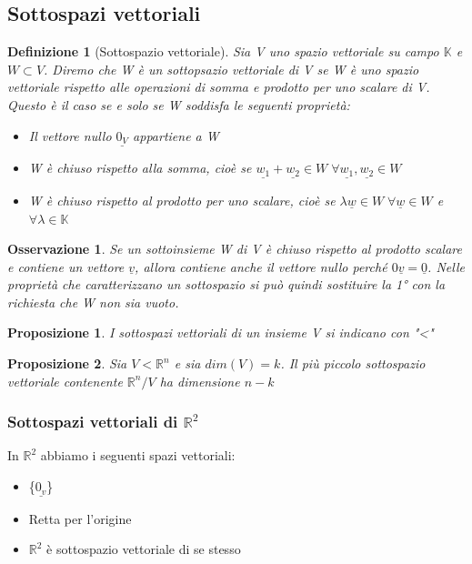 \documentclass[12pt]{article}
\newenvironment{para}{\begin{adjustwidth}{13mm}{}}{\end{adjustwidth}}
\newtheorem{Definizione}{Definizione}[subsection]
\newtheorem{Proposizione}{Proposizione}[subsection]
\newtheorem{Osservazione}{Osservazione}[subsection]
\begin{document}
\begin{para}
\subsection{Sottospazi vettoriali}
\begin{Definizione}[Sottospazio vettoriale]
Sia V uno spazio vettoriale su campo $\mathbb{K}$ e $W \subset V$. Diremo che W è un sottopsazio vettoriale di V se W è uno spazio vettoriale rispetto alle operazioni di somma e prodotto per uno scalare di V. Questo è il caso se e solo se W soddisfa le seguenti proprietà:
\begin{itemize}
    \item  Il vettore nullo $\underline{0_V}$ appartiene a W
    \item W è chiuso rispetto alla somma, cioè se $\underline{w_1}+\underline{w_2}\in W \; \forall\underline{w_1},\underline{w_2}\in W$
    \item W è chiuso rispetto al prodotto per uno scalare, cioè se $\lambda \underline{w}\in W \; \forall\underline{w}\in W$ e $\forall \lambda \in \mathbb{K}$
\end{itemize}
\end{Definizione}

\begin{Osservazione}
Se un sottoinsieme W di V è chiuso rispetto al prodotto scalare e contiene un vettore $\underline{v}$, allora contiene anche il vettore nullo perché $0\underline{v}=\underline{0}$. Nelle proprietà che caratterizzano un sottospazio si può quindi sostituire la 1° con la richiesta che W non sia vuoto.
\end{Osservazione}

\begin{Proposizione}
I sottospazi vettoriali di un insieme V si indicano con "<"
\end{Proposizione}
\begin{Proposizione}
    Sia $V < \mathbb{R}^n$ e sia $dim(V) = k$. Il più piccolo sottospazio vettoriale contenente $\mathbb{R}^n/V$ ha dimensione $n-k$
\end{Proposizione}
\subsubsection{Sottospazi vettoriali di $\mathbb{R}^2$}
In $\mathbb{R}^2$ abbiamo i seguenti spazi vettoriali:
\begin{itemize}
    \item \{$\underline{0_v}$\}
    \item Retta per l'origine
    \item $\mathbb{R}^2$ è sottospazio vettoriale di se stesso
\end{itemize}


\end{para}
\end{document}
